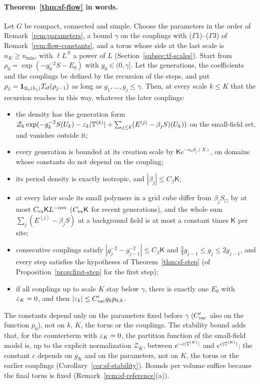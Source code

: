 \paragraph{Theorem~\ref{thm:sf-flow} in words.} Let $G$ be compact, connected and simple. Choose the parameters in the order of Remark~\ref{rem:parameters}, a bound $\gamma$ on the couplings with ($\Gamma$1)--($\Gamma$3) of Remark~\ref{rem:flow-constants}, and a torus whose side at the last scale is $n_K\ge n_{\min}$, with $\ell L^N$ a power of $L$ (Section~\ref{subsec:tf-scales}). Start from $\rho_0=\exp(-g_0^{-2}S-E_0)$ with $g_0\in(0,\gamma]$. Let the generations, the coefficients and the couplings be defined by the recursion of the steps, and put $\rho_j=\mathbf 1_{\mathfrak U_j(h_j)}T_{\rm sf}(\rho_{j-1})$ as long as $g_1,\dots,g_j\le\gamma$. Then, at every scale $k\le K$ that the recursion reaches in this way, whatever the later couplings:
\begin{itemize}
\item[(a)] the density has the generation form $\mathcal Z_k\exp(-g_k^{-2}S(U_k)-\varepsilon_k|\mathbb T^{(k)}|+\sum_{j\le k}(E^{(j)}-\beta_jS)(U_k))$ on the small-field set, and vanishes outside it;
\item[(b)] every generation is bounded at its creation scale by $\mathsf Ke^{-\kappa_nd_j(X)}$, on domains whose constants do not depend on the coupling;
\item[(c)] its period density is exactly isotropic, and $|\beta_j|\le C_\beta\mathsf K$;
\item[(d)] at every later scale its small polymers in a grid cube differ from $\beta_jS_\Box$ by at most $C_{\rm ex}\mathsf KL^{-\alpha m}$ ($C_{\rm ex}\mathsf K$ for recent generations), and the whole sum $\sum_j(E^{(j)}-\beta_jS)$ at a background field is at most a constant times $\mathsf K$ per site;
\item[(e)] consecutive couplings satisfy $|g_j^{-2}-g_{j-1}^{-2}|\le C_\beta\mathsf K$ and $\frac34g_{j-1}\le g_j\le2g_{j-1}$, and every step satisfies the hypotheses of Theorem~\ref{thm:sf-step} (of Proposition~\ref{prop:first-step} for the first step);
\item[(f)] if all couplings up to scale $K$ stay below $\gamma$, there is exactly one $E_0$ with $\varepsilon_K=0$, and then $|\varepsilon_k|\le C'_{\rm vac}g_kp_{0,k}$.
\end{itemize}
The constants depend only on the parameters fixed before $\gamma$ ($C'_{\rm vac}$ also on the function $p_0$), not on $k$, $K$, the torus or the couplings. The stability bound adds that, for the counterterm with $\varepsilon_K=0$, the partition function of the small-field model is, up to the explicit normalization $\mathcal Z_K$, between $e^{-c|\mathbb T^{(K)}|}$ and $e^{c|\mathbb T^{(K)}|}$; the constant $c$ depends on $g_K$ and on the parameters, not on $K$, the torus or the earlier couplings (Corollary~\ref{cor:sf-stability}). Bounds per volume suffice because the final torus is fixed (Remark~\ref{rem:sf-reference}(a)).

